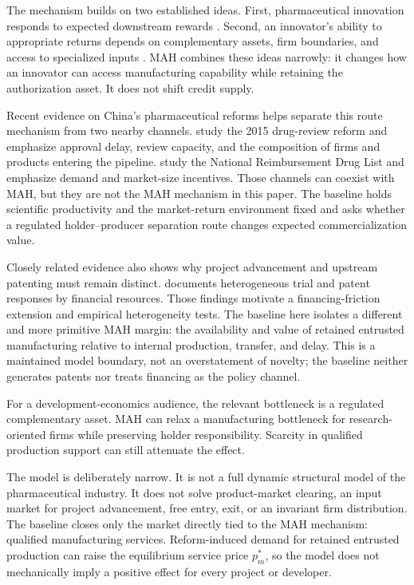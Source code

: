 \documentclass[12pt]{article}
\newcommand{\1}{\mathbf{1}}
\begin{document}
The mechanism builds on two established ideas. First, pharmaceutical
innovation responds to expected downstream rewards
\citep{Schmookler1966,AcemogluLinn2004,Finkelstein2004,DuboisDeMouzonScottMortonSeabright2015,BudishRoinWilliams2015}.
Second, an innovator's ability to appropriate returns depends on complementary
assets, firm boundaries, and access to specialized inputs
\citep{Teece1986,AroraFosfuriGambardella2001,GansStern2003,GrossmanHelpman2002,BolerMoxnesUlltveitMoe2015,Ma2026}.
MAH combines these ideas narrowly: it changes how an innovator can access
manufacturing capability while retaining the authorization asset. It does not
shift credit supply.

Recent evidence on China's pharmaceutical reforms helps separate this route
mechanism from two nearby channels. \citet{JiaMaYangZhang2023} study the 2015
drug-review reform and emphasize approval delay, review capacity, and the
composition of firms and products entering the pipeline.
\citet{BarwickXiaXia2026} study the National Reimbursement Drug List and
emphasize demand and market-size incentives. Those channels can coexist with
MAH, but they are not the MAH mechanism in this paper. The baseline holds
scientific productivity and the market-return environment fixed and asks
whether a regulated holder--producer separation route changes expected
commercialization value.

Closely related evidence also shows why project advancement and upstream
patenting must remain distinct. \citet{Gu2024} documents heterogeneous trial
and patent responses by financial resources. Those findings motivate a
financing-friction extension and empirical heterogeneity tests. The baseline
here isolates a different and more primitive MAH margin: the availability and
value of retained entrusted manufacturing relative to internal production,
transfer, and delay. This is a maintained model boundary, not an overstatement
of novelty; the baseline neither generates patents nor treats financing as the
policy channel.

For a development-economics audience, the relevant bottleneck is a regulated
complementary asset. MAH can relax a manufacturing bottleneck for
research-oriented firms while preserving holder responsibility. Scarcity in
qualified production support can still attenuate the effect.

The model is deliberately narrow. It is not a full dynamic structural model
of the pharmaceutical industry. It does not solve product-market clearing,
an input market for project advancement, free entry, exit, or an invariant
firm distribution. The baseline closes only the market directly tied to the
MAH mechanism: qualified manufacturing services. Reform-induced demand for
retained entrusted production can raise the equilibrium service price
\(p_m^*\), so the model does not mechanically imply a positive effect for
every project or developer.
\end{document}
